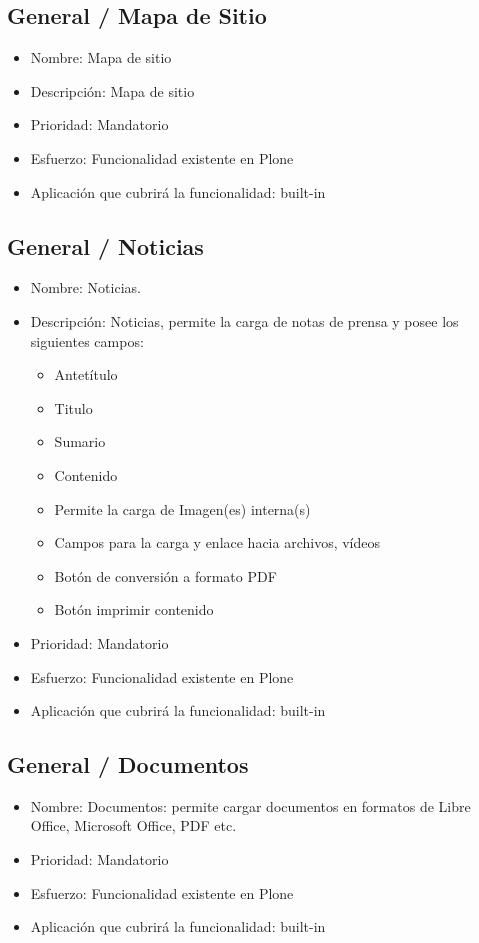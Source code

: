 \documentclass[11pt, letterpaper, oneside, spanish]{scrbook}
\begin{document}
\subsection{General / Mapa de Sitio}
\label{sec-2-1-3}

\begin{itemize}
\item Nombre: Mapa de sitio
\item Descripción: Mapa de sitio
\item Prioridad: Mandatorio
\item Esfuerzo: Funcionalidad existente en Plone
\item Aplicación que cubrirá la funcionalidad:  built-in
\end{itemize}
\subsection{General / Noticias}
\label{sec-2-1-4}

\begin{itemize}
\item Nombre: Noticias.
\item Descripción: Noticias, permite la carga de notas de prensa y posee los
  siguientes campos:
\begin{itemize}
\item Antetítulo
\item Titulo
\item Sumario
\item Contenido
\item Permite la carga de Imagen(es) interna(s)
\item Campos para la carga y enlace hacia archivos, vídeos
\item Botón de conversión a formato PDF
\item Botón imprimir contenido
\end{itemize}
\item Prioridad: Mandatorio
\item Esfuerzo: Funcionalidad existente en Plone
\item Aplicación que cubrirá la funcionalidad:  built-in
\end{itemize}
\subsection{General / Documentos}
\label{sec-2-1-5}

\begin{itemize}
\item Nombre: Documentos: permite cargar documentos en formatos de Libre Office,
  Microsoft Office, PDF etc.
\item Prioridad: Mandatorio
\item Esfuerzo: Funcionalidad existente en Plone
\item Aplicación que cubrirá la funcionalidad:  built-in
\end{itemize}
\end{document}
